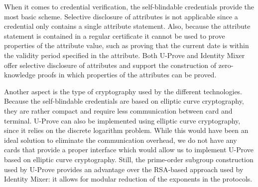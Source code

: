 When it comes to credential verification, the self-blindable credentials provide
the most basic scheme. Selective disclosure of attributes is not applicable
since a credential only contains a single attribute statement. Also, because the
attribute statement is contained in a regular certificate it cannot be used to
prove properties of the attribute value, such as proving that the current date
is within the validity period specified in the attribute. Both U-Prove and Identity Mixer offer
selective disclosure of attributes and support the construction of
zero-knowledge proofs in which properties of the attributes can be proved.

Another aspect is the type of cryptography used by the different technologies.
Because the self-blindable credentials are based on elliptic curve cryptography,
they are rather compact and require less communication between card and
terminal. U-Prove can also be implemented using elliptic curve cryptography,
since it relies on the discrete logarithm problem. While this would have been
an ideal solution to eliminate the communication overhead, we do not have any
cards that provide a proper interface which would allow us to implement U-Prove
based on elliptic curve cryptography. Still, the prime-order subgroup
construction used by U-Prove provides an advantage over the RSA-based approach
used by Identity Mixer: it allows for modular reduction of the exponents in the
protocols.

